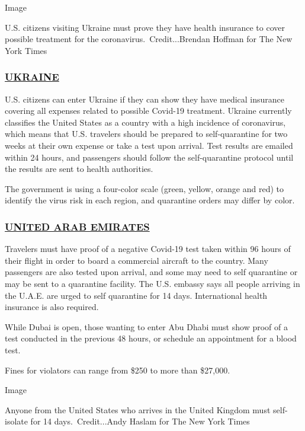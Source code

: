 Image

U.S. citizens visiting Ukraine must prove they have health insurance to
cover possible treatment for the coronavirus.~Credit...Brendan Hoffman
for The New York Times

\hypertarget{ukraine}{%
\subsubsection{\texorpdfstring{\href{https://ua.usembassy.gov/covid-19-information/}{UKRAINE}}{UKRAINE}}\label{ukraine}}

U.S. citizens can enter Ukraine if they can show they have medical
insurance covering all expenses related to possible Covid-19 treatment.
Ukraine currently classifies the United States as a country with a high
incidence of coronavirus, which means that U.S. travelers should be
prepared to self-quarantine for two weeks at their own expense or take a
test upon arrival. Test results are emailed within 24 hours, and
passengers should follow the self-quarantine protocol until the results
are sent to health authorities.

The government is using a four-color scale (green, yellow, orange and
red) to identify the virus risk in each region, and quarantine orders
may differ by color.

\hypertarget{united-arab-emirates}{%
\subsubsection{\texorpdfstring{\href{https://ae.usembassy.gov/u-s-citizen-services/covid-19-information/}{UNITED
ARAB EMIRATES}}{UNITED ARAB EMIRATES}}\label{united-arab-emirates}}

Travelers must have proof of a negative Covid-19 test taken within 96
hours of their flight in order to board a commercial aircraft to the
country. Many passengers are also tested upon arrival, and some may need
to self quarantine or may be sent to a quarantine facility. The U.S.
embassy says all people arriving in the U.A.E. are urged to self
quarantine for 14 days. International health insurance is also required.

While Dubai is open, those wanting to enter Abu Dhabi must show proof of
a test conducted in the previous 48 hours, or schedule an appointment
for a blood test.

Fines for violators can range from \$250 to more than \$27,000.

Image

Anyone from the United States who arrives in the United Kingdom must
self-isolate for 14 days.~Credit...Andy Haslam for The New York Times

